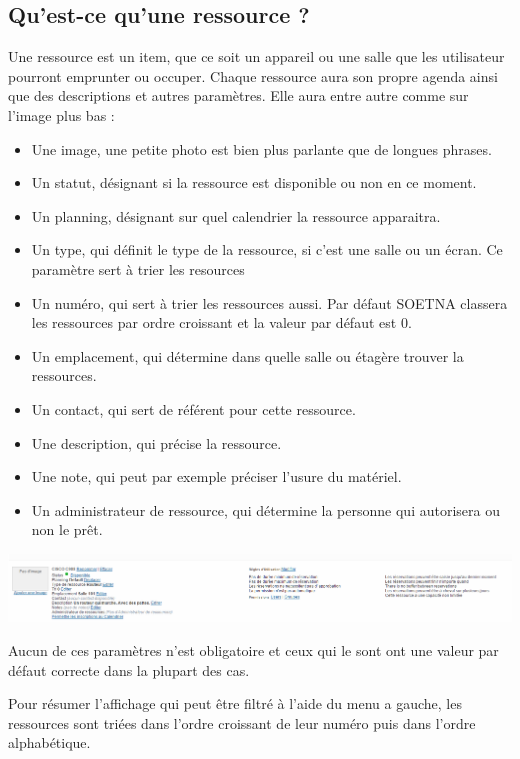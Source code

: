 \documentclass[a4paper,11pt]{article}
\begin{document}
\subsection{Qu'est-ce qu'une ressource ?}

Une ressource est un item, que ce soit un appareil ou une salle que les utilisateur pourront emprunter ou occuper.
Chaque ressource aura son propre agenda ainsi que des descriptions et autres paramètres. Elle aura entre autre comme sur l'image plus bas :

\begin{itemize}
 \item Une image, une petite photo est bien plus parlante que de longues phrases.
 \item Un statut, désignant si la ressource est disponible ou non en ce moment.
 \item Un planning, désignant sur quel calendrier la ressource apparaitra.
 \item Un type, qui définit le type de la ressource, si c'est une salle ou un écran. Ce paramètre sert à trier les resources
 \item Un numéro, qui sert à trier les ressources aussi. Par défaut SOETNA classera les ressources par ordre croissant et la valeur par défaut est 0.
 \item Un emplacement, qui détermine dans quelle salle ou étagère trouver la ressources.
 \item Un contact, qui sert de référent pour cette ressource.
 \item Une description, qui précise la ressource.
 \item Une note, qui peut par exemple préciser l'usure du matériel.
 \item Un administrateur de ressource, qui détermine la personne qui autorisera ou non le prêt.
\end{itemize}

\includegraphics[width=15cm]{./res3.PNG}

Aucun de ces paramètres n'est obligatoire et ceux qui le sont ont une valeur par défaut correcte dans la plupart des cas.

Pour résumer l'affichage qui peut être filtré à l'aide du menu a gauche, les ressources sont triées dans
l'ordre croissant de leur numéro puis dans l'ordre alphabétique.
\end{document}
